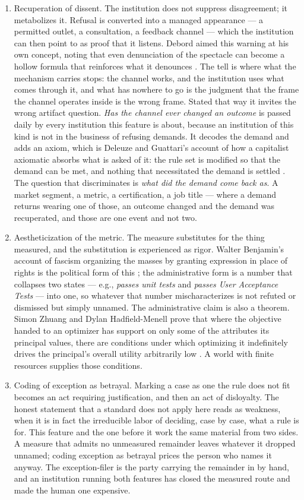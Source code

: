 \begin{enumerate}
  \item Recuperation of dissent. The institution does not suppress disagreement; it metabolizes it. Refusal is converted into a managed appearance — a permitted outlet, a consultation, a feedback channel — which the institution can then point to as proof that it listens. Debord aimed this warning at his own concept, noting that even denunciation of the spectacle can become a hollow formula that reinforces what it denounces \autocite{debord1967spectacle}. The tell is where what the mechanism carries stops: the channel works, and the institution uses what comes through it, and what has nowhere to go is the judgment that the frame the channel operates inside is the wrong frame. Stated that way it invites the wrong artifact question. \emph{Has the channel ever changed an outcome} is passed daily by every institution this feature is about, because an institution of this kind is not in the business of refusing demands. It decodes the demand and adds an axiom, which is Deleuze and Guattari's account of how a capitalist axiomatic absorbs what is asked of it: the rule set is modified so that the demand can be met, and nothing that necessitated the demand is settled \autocite[Plateau~13]{deleuze1987plateaus}. The question that discriminates is \emph{what did the demand come back as}. A market segment, a metric, a certification, a job title — where a demand returns wearing one of those, an outcome changed and the demand was recuperated, and those are one event and not two.
  \item Aestheticization of the metric. The measure substitutes for the thing measured, and the substitution is experienced as rigor. Walter Benjamin's account of fascism organizing the masses by granting expression in place of rights is the political form of this \autocite{benjamin1935artwork}; the administrative form is a number that collapses two states — e.g., \textit{passes unit tests} and \textit{passes User Acceptance Tests} — into one, so whatever that number mischaracterizes is not refuted or dismissed but simply unnamed. The administrative claim is also a theorem. Simon Zhuang and Dylan Hadfield-Menell prove that where the objective handed to an optimizer has support on only some of the attributes its principal values, there are conditions under which optimizing it indefinitely drives the principal's overall utility arbitrarily low \autocite{zhuang2020consequences}. A world with finite resources supplies those conditions.
  \item Coding of exception as betrayal. Marking a case as one the rule does not fit becomes an act requiring justification, and then an act of disloyalty. The honest statement that a standard does not apply here reads as weakness, when it is in fact the irreducible labor of deciding, case by case, what a rule is for. This feature and the one before it work the same material from two sides. A measure that admits no unmeasured remainder leaves whatever it dropped unnamed; coding exception as betrayal prices the person who names it anyway. The exception-filer is the party carrying the remainder in by hand, and an institution running both features has closed the measured route and made the human one expensive.

\end{enumerate}

